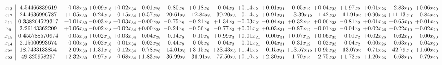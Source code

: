 \documentclass[9pt]{article}
\begin{document}
 \[\begin{array}{c| c c@{\hskip 2pt} c@{\hskip 2pt} c@{\hskip 2pt} c@{\hskip 2pt} c@{\hskip 2pt} c@{\hskip 2pt} c@{\hskip 2pt} c@{\hskip 2pt} c@{\hskip 2pt} c@{\hskip 2pt} c@{\hskip 2pt} c@{\hskip 2pt} c@{\hskip 2pt} c@{\hskip 2pt} c@{\hskip 2pt} }
 x_{13}   &  4.54466839619 & -0.08 x_{30} & +  0.09 x_{18} & +  0.02 x_{34} & -0.01 x_{28} & -0.80 x_{8} & +  0.18 x_{6} & -0.04 x_{3} & +  0.14 x_{21} & +  0.01 x_{31} & -0.05 x_{12} & +  0.04 x_{33} & +  1.97 x_{2} & +  0.01 x_{26} & -2.83 x_{10} & +  0.06 x_{20}\\
 x_{17}   &  24.4636996787 & +  1.05 x_{30} & -0.24 x_{18} & -0.15 x_{34} & +  0.57 x_{28} & + 20.61 x_{8} & -12.84 x_{6} & -39.20 x_{3} & -0.14 x_{21} & +  0.91 x_{31} & -13.39 x_{12} & -1.42 x_{33} & + 11.91 x_{2} & +  0.90 x_{26} & + 11.13 x_{10} & -0.84 x_{20}\\
 x_{11}   &  0.338264529317 & -0.01 x_{30} & -0.03 x_{18} & -0.03 x_{34} & -0.00 x_{28} & -0.75 x_{8} & -0.21 x_{6} & +  1.34 x_{3} & -0.03 x_{21} & -0.04 x_{31} & +  0.32 x_{12} & +  0.06 x_{33} & -0.81 x_{2} & +  0.01 x_{26} & +  0.65 x_{10} & +  0.01 x_{20}\\
 x_{9}   &  3.26143362209 & +  0.06 x_{30} & -0.02 x_{18} & -0.02 x_{34} & +  0.00 x_{28} & -0.24 x_{8} & -0.56 x_{6} & -0.77 x_{3} & +  0.01 x_{21} & +  0.03 x_{31} & -0.87 x_{12} & -0.01 x_{33} & -0.04 x_{2} & +  0.02 x_{26} & -0.22 x_{10} & -0.02 x_{20}\\
 x_{15}   &  0.455788570974 & -0.05 x_{30} & +  0.02 x_{18} & +  0.03 x_{34} & -0.04 x_{28} & -0.14 x_{8} & -0.10 x_{6} & +  0.99 x_{3} & +  0.01 x_{21} & -0.00 x_{31} & +  0.07 x_{12} & +  0.06 x_{33} & -0.01 x_{2} & +  0.02 x_{26} & -0.62 x_{10} & -0.00 x_{20}\\
 x_{14}   &  2.15000993674 & -0.00 x_{30} & -0.02 x_{18} & -0.01 x_{34} & -0.02 x_{28} & -0.44 x_{8} & -0.05 x_{6} & -0.04 x_{3} & -0.01 x_{21} & -0.04 x_{31} & -0.31 x_{12} & -0.02 x_{33} & -0.04 x_{2} & -0.00 x_{26} & +  0.63 x_{10} & -0.04 x_{20}\\
 x_{22}   &  18.7433133854 & -2.09 x_{30} & +  1.31 x_{18} & -0.12 x_{34} & -0.78 x_{28} & -14.01 x_{8} & +  3.15 x_{6} & + 23.43 x_{3} & +  1.41 x_{21} & -0.15 x_{31} & + 13.57 x_{12} & +  0.95 x_{33} & + 13.07 x_{2} & -0.71 x_{26} & -42.79 x_{10} & +  1.60 x_{20}\\
 x_{23}   &  49.325958297 & +  2.32 x_{30} & -0.97 x_{18} & -0.68 x_{34} & +  1.83 x_{28} & + 36.99 x_{8} & -31.91 x_{6} & -77.50 x_{3} & +  0.10 x_{21} & +  2.30 x_{31} & -1.70 x_{12} & -2.75 x_{33} & +  1.72 x_{2} & +  1.20 x_{26} & +  6.68 x_{10} & -0.79 x_{20}\\

\end{array}\]
\end{document}
